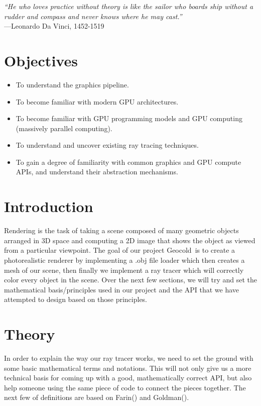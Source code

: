 \documentclass[a4paper, 12pt]{article}
\newcommand\PROJECTNAME{Geocold}
\begin{document}
\begin{tcolorbox}
\begin{center}
	\textit{``He who loves practice without theory is like the sailor who 
	boards ship without a rudder and compass and never knows where he may cast.''} \\
	---Leonardo Da Vinci, 1452-1519
	\end{center}
\end{tcolorbox}

\section{Objectives}
\begin{itemize}
	\item To understand the graphics pipeline.
	\item To become familiar with modern GPU architectures.
	\item To become familiar with GPU programming models and GPU computing (massively parallel computing).
	\item To understand and uncover existing ray tracing techniques.
	\item To gain a degree of familiarity with common graphics and GPU compute APIs, 
	and understand their abstraction mechanisms.
\end{itemize}


\section{Introduction}
	

Rendering is the task of taking a scene composed of many geometric 
objects arranged in 3D space and computing a 2D image that shows the object 
as viewed from a particular viewpoint. The goal of our project \PROJECTNAME~is to create 
a photorealistic renderer by implementing a .obj file loader which then 
creates a mesh of our scene, then finally we implement a ray tracer 
which will correctly color every object in the scene. 
Over the next few sections, we will try and set the mathematical 
basis/principles used in our project and the API that we have attempted to 
design based on those principles.

\section{Theory}
In order to explain the way our ray tracer works, we need to 
set the ground with some basic mathematical 
terms and notations. This will not only give us a more 
technical basis for coming up with a good, mathematically 
correct API, but also help someone using the same 
piece of code to connect the pieces together. The next few of definitions are based on 
Farin(\cite{farin}) and Goldman(\cite{Goldman1985IllicitEI}).
\end{document}
